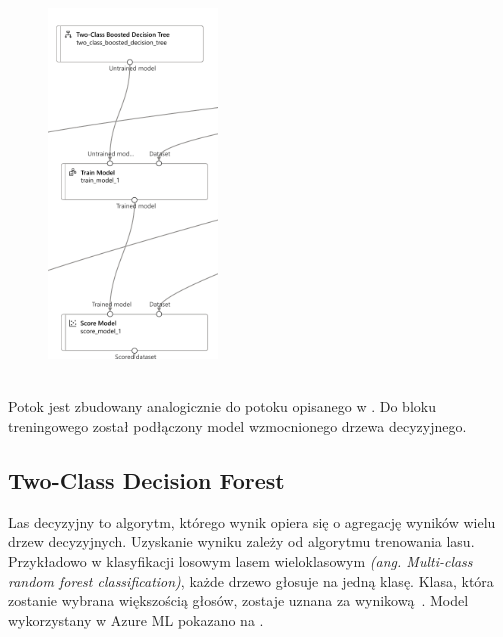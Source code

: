 \begin{figure}[H]
    \centering
    \includegraphics[width=0.4\textwidth]{images/dt_pipe}
    \label{fig:dt-pipe}
\end{figure}
\ \\
Potok jest zbudowany analogicznie do potoku opisanego w . Do bloku treningowego został podłączony model wzmocnionego drzewa decyzyjnego.

\subsection{Two-Class Decision Forest}
Las decyzyjny to algorytm, którego wynik opiera się o agregację wyników wielu drzew decyzyjnych. Uzyskanie wyniku zależy od algorytmu trenowania lasu. Przykładowo w klasyfikacji losowym lasem wieloklasowym \textit{(ang. Multi-class random forest classification)}, każde drzewo głosuje na jedną klasę. Klasa, która zostanie wybrana większością głosów, zostaje uznana za wynikową~\cite{Google}. Model wykorzystany w Azure ML pokazano na .

